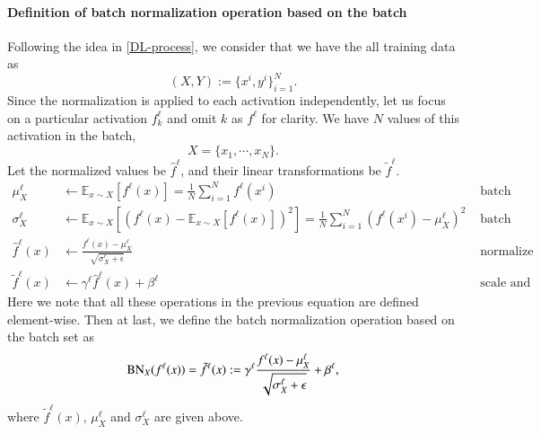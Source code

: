 \paragraph{Definition of batch normalization operation based on the batch}
Following the idea in \eqref{DL-process}, we consider that we have the all
training data as
\begin{equation}\label{eq:trainingdata}
(X,Y) := \{x^i, y^i\}_{i=1}^N.
\end{equation}
Since the normalization is applied to
each activation independently, let us focus on a particular activation $ f^\ell_k$ and omit $k$ as $f^\ell$ for clarity. 
We have $N$ values of this activation
in the batch,
$$ X=\{x_1, \cdots, x_N\}.$$ 
Let the normalized values be
$\hat f^\ell$, and their linear transformations be $\tilde f^\ell$. 
\begin{equation}\label{def:BNeq}
\begin{aligned}
\mu^\ell_{ X} & \leftarrow \mathbb{E}_{x \sim X} [f^\ell(x)] =  \frac{1}{N}\sum_{i=1}^N f^\ell(x^i) & \text{ batch mean}& \\
\sigma^\ell_{ X} & \leftarrow \mathbb{E}_{x \sim X}  \left[(f^\ell(x)-\mathbb{E}_{x \sim X}[ f^\ell(x)])^2 \right] = \frac{1}{N}\sum_{i=1}^N (f^\ell(x^i)-\mu_{ X}^\ell)^2 &  \text{ batch variance}&\\
\hat f^\ell (x) & \leftarrow \frac{f^\ell(x)-\mu^\ell_{ X}}{\sqrt{\sigma^\ell_{ X}+\epsilon}}   &\text{ normalize}&\\
\tilde f^\ell(x)  & \leftarrow \gamma^\ell \hat f^\ell (x) + \beta^\ell 
&\text{ scale and shift}&
\end{aligned}
\end{equation}
Here we note that all these operations in the previous equation are defined  element-wise.
Then at last, we define the batch normalization operation based on the batch set as
\begin{equation}\label{eq:BNop}
{\rm BN}_{X}({f^\ell(x)}) = \tilde f^\ell(x) := \gamma^\ell  \frac{f^\ell(x)-\mu^\ell_{ X}}{\sqrt{\sigma^\ell_{ X}+\epsilon}}  + \beta^\ell  ,
\end{equation}
where $\tilde f^\ell(x)$, $\mu^\ell_{ X}$ and $\sigma^\ell_{ X}$  are given above.

